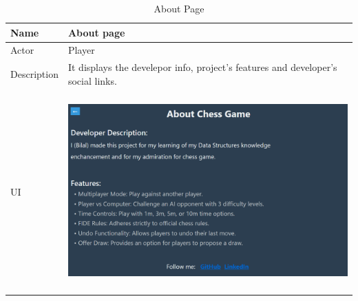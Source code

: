 \documentclass[a4paper,12pt]{article}
\begin{document}
\begin{longtable}{|m{}|m{}|}
    \caption{About Page} \\
    \hline
    Name & About page \\
    \hline
    Actor & Player \\
    \hline
    Description & It displays the develepor info, project's features and developer's social links. \\ 
    \hline
    \centering UI & 
    \begin{center}
        \includegraphics[height=2.7in]{Images/Use Cases/aboutPage.png}
    \end{center} \\ 
    \hline
\end{longtable}
\end{document}
